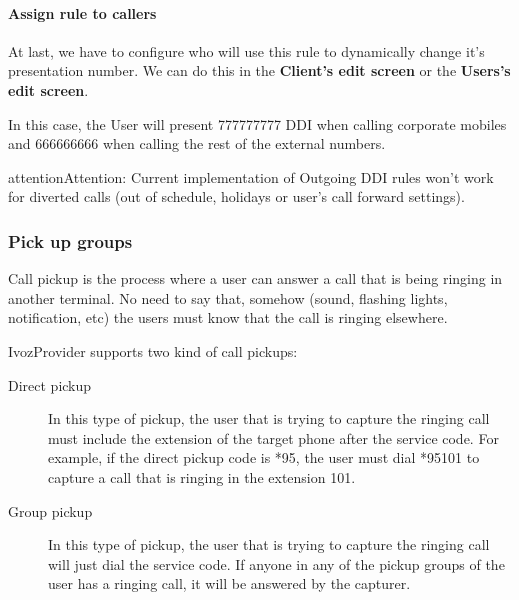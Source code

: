 \documentclass[letterpaper,10pt,english]{sphinxmanual}
\begin{document}
\paragraph{Assign rule to callers}

At last, we have to configure who will use this rule to dynamically change it's
presentation number. We can do this in the \textbf{Client's edit screen} or the
\textbf{Users's edit screen}.

In this case, the User will present 777777777 DDI when calling corporate mobiles
and 666666666 when calling the rest of the external numbers.

\begin{notice}{attention}{Attention:}
Current implementation of Outgoing DDI rules won't work for
diverted calls (out of schedule, holidays or user's call forward settings).
\end{notice}


\subsubsection{Pick up groups}
\label{administration_portal/client/vpbx/user_configuration/pick_up_groups:capture-groups}\label{administration_portal/client/vpbx/user_configuration/pick_up_groups:pick-up-groups}\label{administration_portal/client/vpbx/user_configuration/pick_up_groups::doc}
Call pickup is the process where a user can answer a call that is being ringing
in another terminal. No need to say that, somehow (sound, flashing lights,
notification, etc) the users must know that the call is ringing elsewhere.

IvozProvider supports two kind of call pickups:
\begin{description}
\item[{Direct pickup}] \leavevmode{}\label{administration_portal/client/vpbx/user_configuration/pick_up_groups:term-direct-pickup}
In this type of pickup, the user that is trying to capture the ringing
call must include the extension of the target phone after the service
code. For example, if the direct pickup code is *95, the user must
dial *95101 to capture a call that is ringing in the extension 101.

\item[{Group pickup}] \leavevmode{}\label{administration_portal/client/vpbx/user_configuration/pick_up_groups:term-group-pickup}
In this type of pickup, the user that is trying to capture the ringing
call will just dial the service code. If anyone in any of the pickup
groups of the user has a ringing call, it will be answered by the
capturer.

\end{description}
\end{document}
